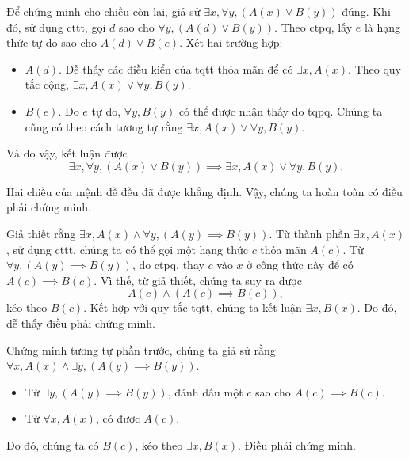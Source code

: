 Để chứng minh cho chiều còn lại, giả sử $\exists x, \forall y, (A(x) \lor B(y))$ đúng. Khi đó, sử dụng cttt, gọi $d$ sao cho $\forall y, (A(d) \lor B(y))$. Theo ctpq, lấy $e$ là hạng thức tự do sao cho $A(d) \lor B(e)$. Xét hai trường hợp: 
\begin{itemize}
   \item $A(d)$. Dễ thấy các điều kiển của tqtt thỏa mãn để có $\exists x, A(x)$. Theo quy tắc cộng, $\exists x, A(x) \lor \forall y, B(y)$.
   \item $B(e)$. Do $e$ tự do, $\forall y, B(y)$ có thể được nhận thấy do tqpq. Chúng ta cũng có theo cách tương tự rằng $\exists x, A(x) \lor \forall y, B(y)$.
\end{itemize}
Và do vậy, kết luận được $$
   \exists x, \forall y, (A(x) \lor B(y)) \implies \exists x, A(x) \lor \forall y, B(y).
$$

Hai chiều của mệnh đề đều đã được khẳng định. Vậy, chúng ta hoàn toàn có điều phải chứng minh.

\stepSubexercise Giả thiết rằng $\exists x, A(x) \land \forall y, (A(y) \implies B(y))$. Từ thành phần $\exists x, A(x)$, sử dụng cttt, chúng ta có thể gọi một hạng thức $c$ thỏa mãn $A(c)$. Từ $\forall y, (A(y) \implies B(y))$, do ctpq, thay $c$ vào $x$ ở công thức này để có $A(c) \implies B(c)$. Vì thế, từ giả thiết, chúng ta suy ra được \begin{equation*}
   A(c) \land (A(c) \implies B(c)),
\end{equation*}
kéo theo $B(c)$. Kết hợp với quy tắc tqtt, chúng ta kết luận $\exists x, B(x)$. Do đó, dễ thấy điều phải chứng minh.

\stepSubexercise Chứng minh tương tự phần trước, chúng ta giả sử rằng $\forall x, A(x) \land \exists y, (A(y) \implies B(y))$. 
\begin{itemize}
   \item Từ $\exists y, (A(y) \implies B(y))$, đánh dấu một $c$ sao cho $A(c) \implies B(c)$.
   \item Từ $\forall x, A(x)$, có được $A(c)$.
\end{itemize}
Do đó, chúng ta có $B(c)$, kéo theo $\exists x, B(x)$. Điều phải chứng minh.

